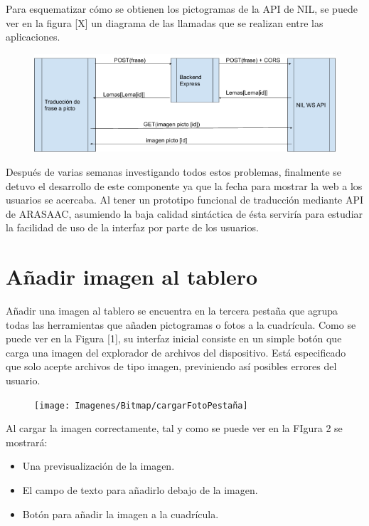 Para esquematizar cómo se obtienen los pictogramas de la API de NIL, se puede ver en la figura [X] un diagrama de las llamadas que se realizan entre las aplicaciones. 

\begin{figure}[h!]
	\centering
	\includegraphics[width=0.7\linewidth]{Imagenes/Bitmap/diagramaConexiones}
	\caption{}
	\label{fig:diagramaconexiones}
\end{figure}


Después de varias semanas investigando todos estos problemas, finalmente se detuvo el desarrollo de este componente ya que la fecha para mostrar la web a los usuarios se acercaba. Al tener un prototipo funcional de traducción mediante API de ARASAAC, asumiendo la baja calidad sintáctica de ésta serviría para estudiar la facilidad de uso de la interfaz por parte de los usuarios.


\section{Añadir imagen al tablero}

Añadir una imagen al tablero se encuentra en la tercera pestaña que agrupa todas las herramientas que añaden pictogramas o fotos a la cuadrícula. Como se puede ver en la Figura [1], su interfaz inicial consiste en un simple botón que carga una imagen del explorador de archivos del dispositivo. Está especificado que solo acepte archivos de tipo imagen, previniendo así posibles errores del usuario. 

\begin{figure}[h!]
	\centering
	\texttt{[image: Imagenes/Bitmap/cargarFotoPestaña]}
	\caption{}
	\label{fig:cargarfotopestana}
\end{figure}


Al cargar la imagen correctamente, tal y como se puede ver en la FIgura 2 se mostrará: 

\begin{itemize}
	\item Una previsualización de la imagen.
	\item El campo de texto para añadirlo debajo de la imagen.
	\item Botón para añadir la imagen a la cuadrícula.
\end{itemize}

